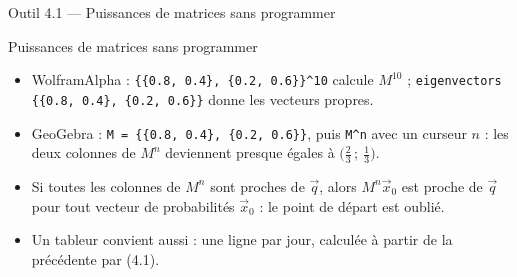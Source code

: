 \begin{frame}{Outil 4.1 --- Puissances de matrices sans programmer}
  \begin{Outil}{Puissances de matrices sans programmer}
    \small
    \begin{itemize}
      \item WolframAlpha : \texttt{\{\{0.8, 0.4\}, \{0.2, 0.6\}\}\^{}10}
        calcule $M^{10}$ ; \texttt{eigenvectors \{\{0.8, 0.4\}, \{0.2,
        0.6\}\}} donne les vecteurs propres.
      \item GeoGebra : \texttt{M = \{\{0.8, 0.4\}, \{0.2, 0.6\}\}}, puis
        \texttt{M\^{}n} avec un curseur $n$ : les deux colonnes de $M^n$
        deviennent presque égales à $\big(\tfrac23\,;\ \tfrac13\big)$.
      \item Si toutes les colonnes de $M^n$ sont proches de $\vec q$, alors
        $M^n\vec x_0$ est proche de $\vec q$ pour tout vecteur de
        probabilités $\vec x_0$ : le point de départ est oublié.
      \item Un tableur convient aussi : une ligne par jour, calculée à
        partir de la précédente par (4.1).
    \end{itemize}
  \end{Outil}
\end{frame}
